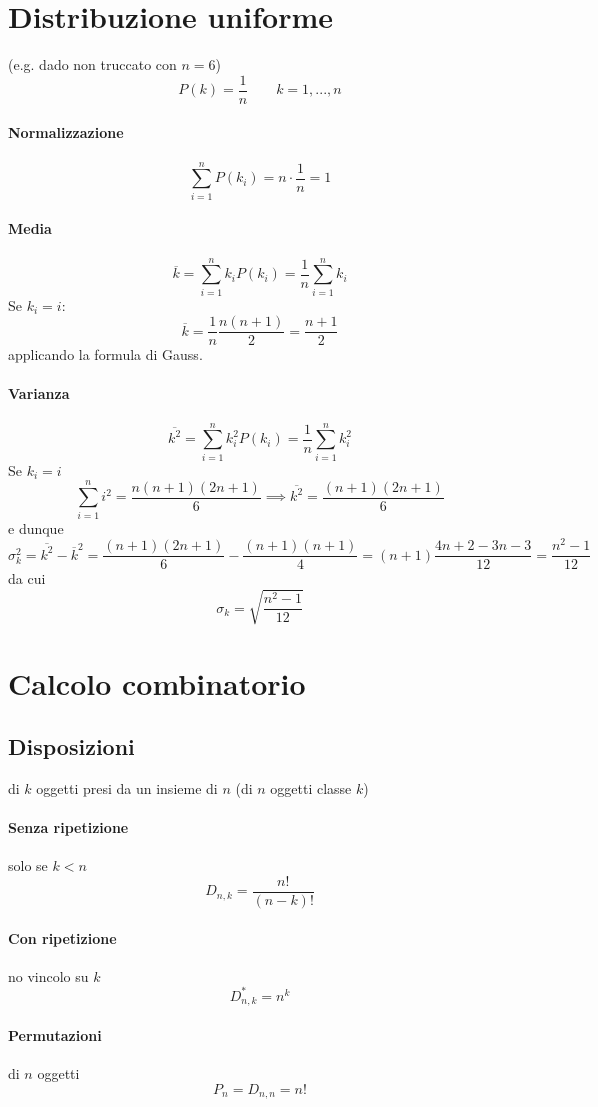 \documentclass[10pt, oneside]{book}
\begin{document}
\section{Distribuzione uniforme}
(e.g. dado non truccato con $n = 6$)
\[P(k) = \frac{1}{n} \qquad k = 1, ..., n\]
\paragraph{Normalizzazione}
\[\sum\limits_{i=1}^n P(k_i) = n \cdot \frac{1}{n} = 1\]

\paragraph{Media}
\[\overline{k} = \sum\limits_{i=1}^n k_i P(k_i) = \frac{1}{n} \sum\limits_{i=1}^n k_i\]
Se $k_i = i$:
\[\overline{k} = \frac{1}{n} \frac{n(n+1)}{2} = \frac{n+1}{2}\]
applicando la formula di Gauss.

\paragraph{Varianza}
\[\overline{k^2} = \sum\limits_{i=1}^n k_i^2 P(k_i) = \frac{1}{n} \sum\limits_{i=1}^n k_i^2\]
Se $k_i = i$
\[\sum\limits_{i=1}^n i^2 = \frac{n (n+1) (2n+1)}{6} \implies \overline{k^2} = \frac{(n+1)(2n+1)}{6}\]
e dunque
\[\sigma_k^2 = \overline{k^2} - \overline{k}^2 = \frac{(n+1) (2n+1)}{6} - \frac{(n+1) (n+1)}{4} = (n+1)\frac{4n + 2 - 3n - 3}{12} = \frac{n^2-1}{12}\]
da cui
\[\sigma_k = \sqrt{\frac{n^2-1}{12}}\]

\section{Calcolo combinatorio}
\subsection*{Disposizioni} di $k$ oggetti presi da un insieme di $n$ (di $n$ oggetti classe $k$)
\paragraph{Senza ripetizione} solo se $k < n$
\[D_{n,k} = \frac{n!}{(n-k)!}\]
\paragraph{Con ripetizione} no vincolo su $k$
\[D_{n,k}^\ast = n^k\]

\paragraph{Permutazioni} di $n$ oggetti
\[P_n = D_{n,n} = n!\]
\end{document}
